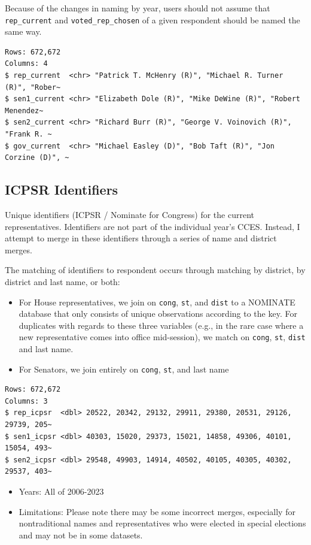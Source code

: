 \documentclass[10pt,article,oneside]{memoir}
\theoremstyle{definition}
\begin{document}
Because of the changes in naming by year, users should not assume that
\texttt{rep\_current} and \texttt{voted\_rep\_chosen} of a given
respondent should be named the same way.

\begin{verbatim}
Rows: 672,672
Columns: 4
$ rep_current  <chr> "Patrick T. McHenry (R)", "Michael R. Turner (R)", "Rober~
$ sen1_current <chr> "Elizabeth Dole (R)", "Mike DeWine (R)", "Robert Menendez~
$ sen2_current <chr> "Richard Burr (R)", "George V. Voinovich (R)", "Frank R. ~
$ gov_current  <chr> "Michael Easley (D)", "Bob Taft (R)", "Jon Corzine (D)", ~
\end{verbatim}

\subsection{ICPSR Identifiers}\label{icpsr-identifiers}

Unique identifiers (ICPSR / Nominate for Congress) for the current
representatives. Identifiers are not part of the individual year's CCES.
Instead, I attempt to merge in these identifiers through a series of
name and district merges.

The matching of identifiers to respondent occurs through matching by
district, by district and last name, or both:

\begin{itemize}
\tightlist
\item
  For House representatives, we join on \texttt{cong}, \texttt{st}, and
  \texttt{dist} to a NOMINATE database that only consists of unique
  observations according to the key. For duplicates with regards to
  these three variables (e.g., in the rare case where a new
  representative comes into office mid-session), we match on
  \texttt{cong}, \texttt{st}, \texttt{dist} and last name.
\item
  For Senators, we join entirely on \texttt{cong}, \texttt{st}, and last
  name
\end{itemize}

\begin{verbatim}
Rows: 672,672
Columns: 3
$ rep_icpsr  <dbl> 20522, 20342, 29132, 29911, 29380, 20531, 29126, 29739, 205~
$ sen1_icpsr <dbl> 40303, 15020, 29373, 15021, 14858, 49306, 40101, 15054, 493~
$ sen2_icpsr <dbl> 29548, 49903, 14914, 40502, 40105, 40305, 40302, 29537, 403~
\end{verbatim}

\begin{itemize}
\tightlist
\item
  Years: All of 2006-2023
\item
  Limitations: Please note there may be some incorrect merges,
  especially for nontraditional names and representatives who were
  elected in special elections and may not be in some datasets.
\end{itemize}
\end{document}
